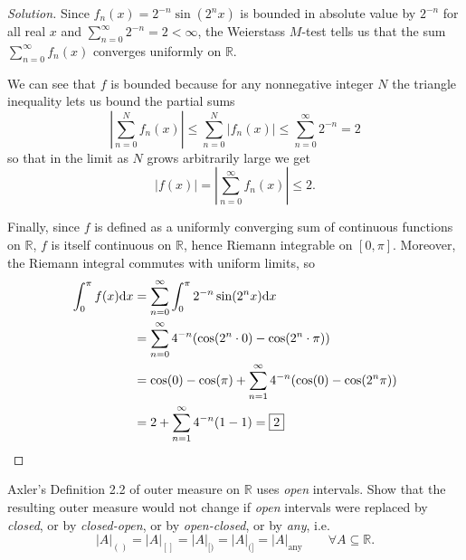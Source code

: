 \documentclass[11pt]{article}
\newcommand{\dd}{\mathrm{d}}
\providecommand{\RR}{\mathbb R}
\newenvironment{soln}{\begin{proof}[Solution]}{\end{proof}}
\providecommand{\abs}[1]{\left|#1\right|}
\begin{document}
\begin{soln}
    Since $f_n(x) = 2^{-n}\sin(2^nx)$ is bounded in absolute value by $2^{-n}$
    for all real $x$ and $\sum_{n=0}^\infty 2^{-n} = 2 < \infty$,
    the Weierstass $M$-test tells us that the sum $\sum_{n=0}^\infty f_n(x)$
    converges uniformly on $\RR$.

    We can see that $f$ is bounded because for any nonnegative integer $N$
    the triangle inequality lets us bound the partial sums
    \begin{equation*}
	\abs{\sum_{n=0}^N f_n(x)} \le
	\sum_{n=0}^N\abs{f_n(x)} \le
	\sum_{n=0}^\infty 2^{-n} = 2
    \end{equation*}
    so that in the limit as $N$ grows arbitrarily large we get
    \begin{equation*}
	\abs{f(x)} = \abs{\sum_{n=0}^\infty f_n(x)} \le 2.
    \end{equation*}

    Finally, since $f$ is defined as a uniformly converging
    sum of continuous functions on $\RR$,
    $f$ is itself continuous on $\RR$, hence Riemann integrable on $[0,\pi]$.
    Moreover, the Riemann integral commutes with uniform limits, so
    \begin{align*}
	\int_0^\pi f(x)\dd x
	&= \sum_{n=0}^\infty \int_0^{\pi} 2^{-n}\sin(2^nx)\dd x\\
	&= \sum_{n=0}^\infty 4^{-n}(\cos(2^n\cdot 0) - \cos(2^n\cdot\pi))\\
	&= \cos(0) - \cos(\pi) + \sum_{n=1}^\infty 4^{-n}(\cos(0)-\cos(2^n\pi))\\
	&= 2 + \sum_{n=1}^\infty 4^{-n}(1-1) = \boxed 2\qedhere
    \end{align*}
\end{soln}

\pagebreak

\begin{problem}
    Axler's Definition 2.2 of outer measure on $\RR$ uses \emph{open} intervals.
    Show that the resulting outer measure would not change if \emph{open} intervals
    were replaced by \emph{closed}, or by \emph{closed-open}, or by \emph{open-closed},
    or by \emph{any}, i.e.
    \begin{equation*}
	|A|_{()} = |A|_{[]} = |A|_{[)} = |A|_{(]} = |A|_{\text{any}}
	\qquad \forall A\subseteq\RR.
    \end{equation*}
\end{problem}
\end{document}
